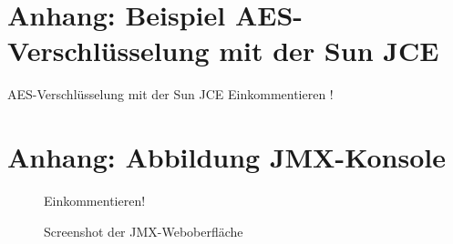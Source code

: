 \documentclass[12pt,oneside,a4paper,bibtotoc,liststotoc,pointlessnumbers]{scrartcl}
\begin{document}
\listoftables



\newpage

\begin{appendix}



\section{Anhang: Beispiel AES-Verschlüsselung mit der Sun JCE}
AES-Verschlüsselung mit der Sun JCE
Einkommentieren !
%
%
%


\newpage


\section{Anhang: Abbildung JMX-Konsole}
\begin{figure}[h]					
\centering
Einkommentieren!
\caption{Screenshot der JMX-Weboberfläche}		%
\label{fig:Fabrikmethode}							%
\end{figure} 	\vspace{-12pt}


\end{appendix}
\end{document}
